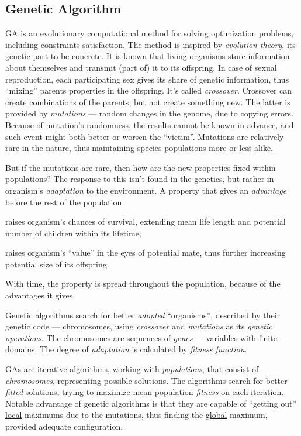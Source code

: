 \documentclass[../ThesisDoc]{subfiles}
\begin{document}
\providecommand{\rootdir}{..}



\subsection{Genetic Algorithm}
GA is an evolutionary computational method for solving optimization problems,
including constraints satisfaction. The method is inspired by \emph{evolution
theory}, its genetic part to be concrete. It is known that living organisms
store information about themselves and transmit (part of) it to its offspring.
In case of sexual reproduction, each participating sex gives its share of
genetic information, thus ``mixing'' parents properties in the offspring.
It's called \emph{crossover}.
Crossover can create combinations of the parents, but not create something new.
The latter is provided by \emph{mutations} --- random changes in the genome, due
to copying errors. Because of mutation's randomness, the results cannot be known
in advance, and such event might both better or worsen the ``victim''. Mutations
are relatively rare in the nature, thus maintaining species populations more or
less alike.

But if the mutations are rare, then how are the new properties fixed within
populations? The response to this isn't found in the genetics, but rather in
organism's \emph{adaptation} to the environment. A property that gives an
\emph{advantage} before the rest of the population
\begin{enumerate*}[1)]
  \item raises organism's chances of survival, extending mean life length and
        potential number of children within its lifetime;
  \item raises organism's ``value'' in the eyes of potential mate, thus further
        increasing potential size of its offspring.
\end{enumerate*}
With time, the property is spread throughout the population, because of the
advantages it gives.

\bigskip\noindent
Genetic algorithms search for better \emph{adopted} ``organisms'', described
by their genetic code --- chromosomes, using \emph{crossover} and \emph{mutations}
as its \emph{genetic operations}.
The chromosomes are \underline{sequences of \emph{genes}} --- variables with finite
domains. The degree of \emph{adaptation} is calculated by
\underline{\emph{fitness function}}.

GAs are iterative algorithms, working with \emph{populations}, that consist of
\emph{chromosomes}, representing possible solutions. The algorithms search
for better \emph{fitted} solutions, trying to maximize mean population
\emph{fitness} on each iteration.
Notable advantage of genetic algorithms is that they are capable of
``getting out'' \underline{local} maximums due to the mutations, thus finding
the \underline{global} maximum, provided adequate configuration.
\end{document}
